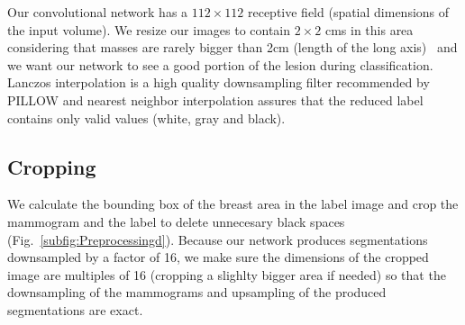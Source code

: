 Our convolutional network has a $112 \times 112$ receptive field (spatial dimensions of the input volume).
We resize our images to contain $2 \times 2$ cms in this area considering that masses are rarely bigger than 2cm (length of the long axis)~\cite{Sahiner1996} and we want our network to see a good portion of the lesion during classification.
Lanczos interpolation is a high quality downsampling filter recommended by PILLOW and nearest neighbor interpolation assures that the reduced label contains only valid values (white, gray and black).


\subsection{Cropping}
We calculate the bounding box of the breast area in the label image and crop the mammogram and the label to delete unnecesary black spaces (Fig.~\ref{subfig:Preprocessingd}). 
Because our network produces segmentations downsampled by a factor of 16, we make sure the dimensions of the cropped image are multiples of 16 (cropping a slighlty bigger area if needed) so that the downsampling of the mammograms and upsampling of the produced segmentations are exact.

